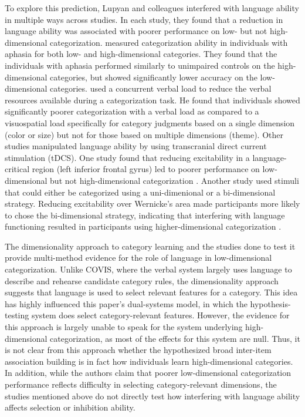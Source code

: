 \documentclass[../dissertation.tex]{subfiles}
\begin{document}
	To explore this prediction, Lupyan and colleagues interfered with language ability in multiple ways across studies. In each study, they found that a reduction in language ability was associated with poorer performance on low- but not high-dimensional categorization. \citet{Lupyan2013} measured categorization ability in individuals with aphasia for both low- and high-dimensional categories. They found that the individuals with aphasia performed similarly to unimpaired controls on the high-dimensional categories, but showed significantly lower accuracy on the low-dimensional categories. \citet{Lupyan2009} used a concurrent verbal load to reduce the verbal resources available during a categorization task. He found that individuals showed significantly poorer categorization with a verbal load as compared to a visuospatial load specifically for category judgments based on a single dimension (color or size) but not for those based on multiple dimensions (theme). Other studies manipulated language ability by using transcranial direct current stimulation (tDCS). One study found that reducing excitability in a language-critical region (left inferior frontal gyrus) led to poorer performance on low-dimensional but not high-dimensional categorization \citep{Lupyan2012b}. Another study used stimuli that could either be categorized using a uni-dimenional or a bi-dimensional strategy. Reducing excitability over Wernicke's area made participants more likely to chose the bi-dimensional strategy, indicating that interfering with language functioning resulted in participants using higher-dimensional categorization \citep{Perry2014}. \par 
	The dimensionality approach to category learning and the studies done to test it provide multi-method evidence for the role of language in low-dimensional categorization. Unlike COVIS, where the verbal system largely uses language to describe and rehearse candidate category rules, the dimensionality approach suggests that language is used to select relevant features for a category. This idea has highly influenced this paper's dual-systems model, in which the hypothesis-testing system does select category-relevant features. However, the evidence for this approach is largely unable to speak for the system underlying high-dimensional categorization, as most of the effects for this system are null. Thus, it is not clear from this approach whether the hypothesized broad inter-item association building is in fact how individuals learn high-dimensional categories. In addition, while the authors claim that poorer low-dimensional categorization performance reflects difficulty in selecting category-relevant dimensions, the studies mentioned above do not directly test how interfering with language ability affects selection or inhibition ability.
	
\end{document}
